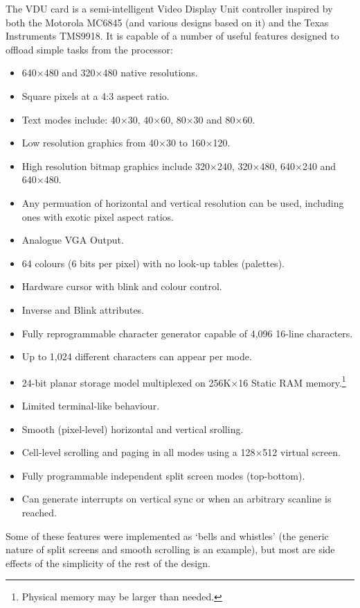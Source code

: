 \label{chap:hard-vdu}

The VDU card is a semi-intelligent Video Display Unit controller inspired by
both the Motorola MC6845 (and various designs based on it) and the Texas
Instruments TMS9918. It is capable of a number of useful features designed to
offload simple tasks from the processor:

\begin{itemize}
\item 640×480 and 320×480 native resolutions.
\item Square pixels at a 4:3 aspect ratio.
\item Text modes include: 40×30, 40×60, 80×30 and 80×60.
\item Low resolution graphics from 40×30 to 160×120.
\item High resolution bitmap graphics include 320×240, 320×480, 640×240 and
  640×480.
\item Any permuation of horizontal and vertical resolution can be used,
  including ones with exotic pixel aspect ratios.
\item Analogue VGA Output.
\item 64 colours (6 bits per pixel) with no look-up tables (palettes).
\item Hardware cursor with blink and colour control.
\item Inverse and Blink attributes.
\item Fully reprogrammable character generator capable of 4,096 16-line
  characters.
\item Up to 1,024 different characters can appear per mode.
\item 24-bit planar storage model multiplexed on 256K×16 Static RAM memory.\footnote{Physical memory may be larger than needed.}
\item Limited terminal-like behaviour.
\item Smooth (pixel-level) horizontal and vertical srolling.
\item Cell-level scrolling and paging in all modes using a 128×512 virtual
  screen.
\item Fully programmable independent split screen modes (top-bottom).
\item Can generate interrupts on vertical sync or when an arbitrary scanline is
  reached.
\end{itemize}

Some of these features were implemented as ‘bells and whistles’ (the generic
nature of split screens and smooth scrolling is an example), but most are side
effects of the simplicity of the rest of the design.

